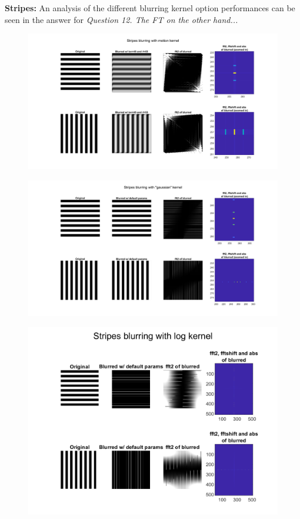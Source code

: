 \textbf{Stripes:}
An analysis of the different blurring kernel option performances can be seen in the answer for \textit{Question 12. The FT on the other hand...}



\begin{figure}[H]
    \centering
    \includegraphics[width=0.75\linewidth]{Doc/Graphics/Part1/Q14a.png}
\end{figure}

\begin{figure}[H]
    \centering
    \includegraphics[width=0.75\linewidth]{Doc/Graphics/Part1/Q14b.png}
\end{figure}

\begin{figure}[H]
    \centering
    \includegraphics[width=0.75\linewidth]{Doc/Graphics/Part1/Q14c.png}
\end{figure}

